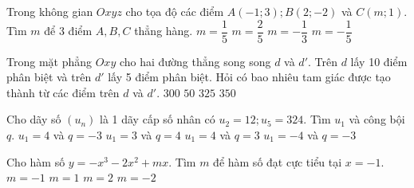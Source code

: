 \begin{ex}%
	Trong không gian $Oxyz$ cho tọa độ các điểm $A(-1;3);B(2;-2)$ và $C(m;1)$. Tìm $m$ để $3$ điểm $A,B,C$ thẳng hàng.
	\choice
	{$m=\dfrac{1}{5}$}
	{$m=\dfrac{2}{5}$}
	{$m=-\dfrac{1}{3}$}
	{\True $m=-\dfrac{1}{5}$}
\end{ex}

\begin{ex}%
	Trong mặt phẳng $Oxy$ cho hai đường thẳng song song $d$ và $d'$. Trên $d$ lấy 10 điểm phân biệt và trên $d'$ lấy 5 điểm phân biệt. Hỏi có bao nhiêu tam giác được tạo thành từ các điểm trên $d$ và $d'$.
	\choice
	{$300$}
	{$50$}
	{\True $325$}
	{$350$}
\end{ex}

\begin{ex}%
	Cho dãy số $(u_n)$ là 1 dãy cấp số nhân có $u_2=12;u_5=324$. Tìm $u_1$ và công bội $q$.
	\choice
	{$u_1=4$ và $q=-3$}
	{$u_1=3$ và $q=4$}
	{\True $u_1=4$ và $q=3$}
	{$u_1=-4$ và $q=-3$}
\end{ex}

\begin{ex}%
	Cho hàm số $y=-x^3-2x^2+mx$. Tìm $m$ để hàm số đạt cực tiểu tại $x=-1$.
	\choice
	{$m=-1$}
	{\True $m=1$}
	{$m=2$}
	{$m=-2$}
\end{ex}

